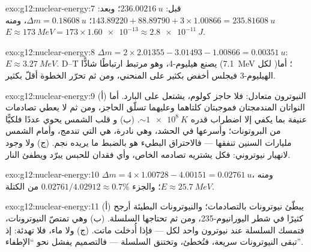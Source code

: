 \begin{solution}{exo:g12:nuclear-energy:7}
قبل: $\qty{236.00216}{u}$؛ وبعد: $143.89220 + 88.89790 +
3 \times 1.00866 = \qty{235.81608}{u}$؛ $\Delta m = \qty{0.18608}{u}$،
ومنه $E \approx \qty{173}{MeV} = 173 \times \num{1.60e-13} \approx
\qty{2.8e-11}{J}$.
\end{solution}

\begin{solution}{exo:g12:nuclear-energy:8}
$\Delta m = 2 \times 2.01355 - 3.01493 - 1.00866 = \qty{0.00351}{u}$:
$E \approx \qty{3.27}{MeV}$.  D--T يصنع هيليوم-4، وهو مرتبط ارتباطًا شاذًّا
(\qty{7.1}{MeV} لكل )؛ أما الهيليوم-3 فيجلس أخفض بكثير على المنحني، ومن ثم
تحرّر الخطوة أقلّ بكثير.
\end{solution}

\begin{solution}{exo:g12:nuclear-energy:9}
(أ) النيوترون متعادل: فلا حاجز كولوم،  يشتعل على البارد.
أما النواتان المندمجتان فموجبتان كلتاهما وعليهما تسلّق الحاجز، ومن ثم لا يعطي
تصادمات عنيفة بما يكفي إلا اضطراب قدره $\sim \qty{1e8}{K}$. (ب) و
قلب الشمس يحوي عددًا فلكيًّا من البروتونات؛ وأسرعها في الحشد، وهي نادرة،
هي التي تندمج، وأمام الشمس مليارات السنين تنفقها
--- فالاحتراق البطيء هو بالضبط ما يريده نجم. (ج) ولا وجود لانهيار
نيوتروني: فكل  يشتريه تصادمه الخاص، وأي فقدان
للحبس يبرّد  ويطفئ النار.
\end{solution}

\begin{solution}{exo:g12:nuclear-energy:10}
$\Delta m = 4 \times 1.00728 - 4.00151 = \qty{0.02761}{u}$، ومنه
$E \approx \qty{25.7}{MeV}$؛ والجزء
$0.02761/4.02912 \approx 0.7\%$ من الكتلة.
\end{solution}

\begin{solution}{exo:g12:nuclear-energy:11}
(أ) يبطّئ نيوترونات  بالتصادمات؛ والنيوترونات البطيئة أرجح
كثيرًا في شطر اليورانيوم-235، ومن ثم تحتاجها السلسلة. (ب) وهي
تمتصّ النيوترونات، فتمسك السلسلة عند نيوترون واحد لكل  ---
فإذا أُدخلت ماتت. (ج) ولا ماء، فلا تهدئة: إذ تبقى النيوترونات
سريعة، فتُخطئ، وتختنق السلسلة --- فالتصميم يفشل نحو
``الإطفاء''.
\end{solution}

